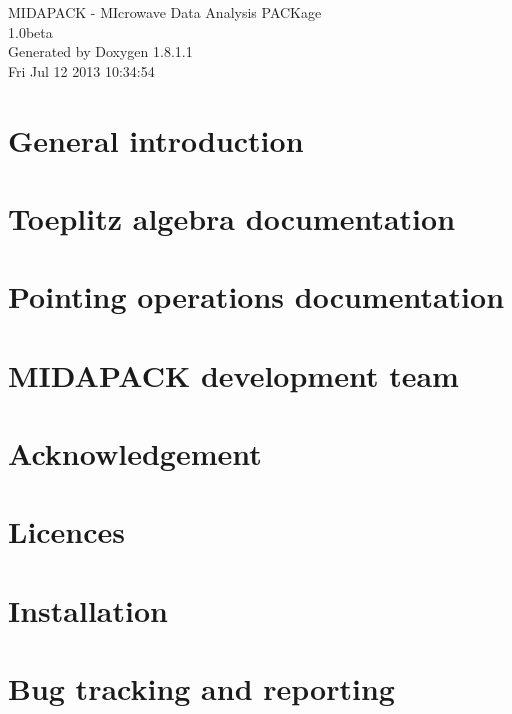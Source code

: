\documentclass{book}
\begin{document}
\begin{titlepage}
\vspace*{7cm}
\begin{center}
{\Large M\-I\-D\-A\-P\-A\-C\-K -\/ M\-Icrowave Data Analysis P\-A\-C\-Kage \\[1ex]\large 1.\-0beta }\\
\vspace*{1cm}
{\large Generated by Doxygen 1.8.1.1}\\
\vspace*{0.5cm}
{\small Fri Jul 12 2013 10:34:54}\\
\end{center}
\end{titlepage}
\clearemptydoublepage
{}
\tableofcontents
\clearemptydoublepage
{}
\chapter{General introduction}
\label{index}\hypertarget{index}{}
\chapter{Toeplitz algebra documentation}
\label{toeplitz}

\chapter{Pointing operations documentation}
\label{pointing}

\chapter{M\-I\-D\-A\-P\-A\-C\-K development team}
\label{sect_team}

\chapter{Acknowledgement}
\label{sect_ackno}

\chapter{Licences}
\label{page_license}

\chapter{Installation}
\label{page_install}

\chapter{Bug tracking and reporting}
\label{sect_bugreporting}

\end{document}
